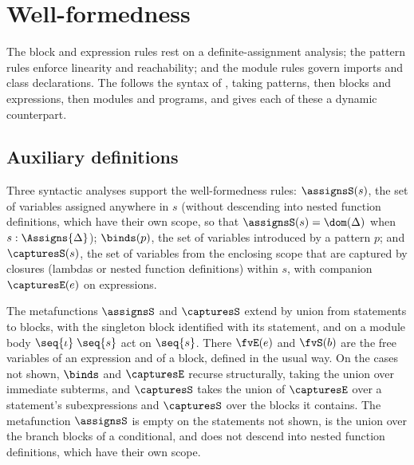 \section{Well-formedness}
\label{sec:well-formedness}

 The block and expression rules rest on a definite-assignment analysis; the pattern rules
enforce linearity and reachability; and the module rules govern imports and class declarations. The
\seckind{} follows the syntax of , taking patterns, then blocks and expressions, then modules
and programs, and  gives each of these a dynamic counterpart.

\subsection{Auxiliary definitions}
\label{sec:wf-aux}

Three syntactic analyses support the well-formedness rules: $\assignsS(s)$, the set of variables assigned
anywhere in $s$ (without descending into nested function definitions, which have their own scope, so that
$\assignsS(s) = \dom(\Delta)$ when $s : \Assigns{\Delta}$); $\binds(p)$, the set of variables introduced by a
pattern $p$; and $\capturesS(s)$, the set of variables from the enclosing scope that are captured by closures
(lambdas or nested function definitions) within $s$, with companion $\capturesE(e)$ on expressions.
\begin{PaperOnly}
The metafunctions $\assignsS$ and $\capturesS$ extend by union from statements to blocks, with the singleton
block identified with its statement, and on a module body $\seq{\iota}\;\seq{s}$ act on $\seq{s}$.
There $\fvE(e)$ and $\fvS(b)$ are the free variables of an expression and of a block, defined in the
usual way. On the cases not shown, $\binds$ and $\capturesE$ recurse structurally, taking the union over
immediate subterms, and $\capturesS$ takes the union of $\capturesE$ over a statement's subexpressions and
$\capturesS$ over the blocks it contains. The metafunction $\assignsS$ is empty on the statements not shown, is the union over the branch blocks of
a conditional, and does not descend into nested function definitions, which have their own scope.


\end{PaperOnly}

